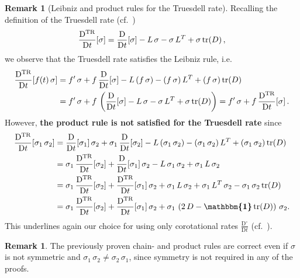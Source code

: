 \documentclass[10pt]{article}
\newcounter{theoremCounter}
\numberwithin{theoremCounter}{section}
\theoremstyle{plain}
\theoremstyle{definition}
\newtheorem{rem}[theoremCounter]{Remark}
\newcommand{\id}{{\boldsymbol{\mathbbm{1}}}}
\newcommand{\DD}{\mathrm{D}}
\DeclareMathOperator{\tr}{tr}
\DeclareMathOperator{\TR}{TR}
\def\tr{\textnormal{tr}}
\numberwithin{equation}{section}
\begin{document}
%
\begin{rem}[Leibniz and product rules for the Truesdell rate]
Recalling the definition of the Truesdell rate (cf.~\cite[eq.~3]{truesdellremarks})
	\begin{align}
	\frac{\DD^{\TR}}{\DD t}[\sigma] = \frac{\DD}{\DD t}[\sigma] - L \, \sigma - \sigma \, L^T + \sigma \, \tr(D) \, ,
	\end{align}
we observe that the Truesdell rate satisfies the Leibniz rule, i.e.
	\begin{equation}
	\begin{alignedat}{2}
	\frac{\DD^{\TR}}{\DD t}[f(t) \, \sigma] &= f' \, \sigma + f \, \frac{\DD}{\DD t}[\sigma] - L \, (f \, \sigma) - (f \, \sigma) \, L^T + (f \, \sigma) \, \tr(D) \\ 
	&= f' \, \sigma + f \, \left(\frac{\DD}{\DD t}[\sigma] - L \, \sigma - \sigma \, L^T + \sigma \, \tr(D)\right) = f' \, \sigma + f \, \frac{\DD^{\TR}}{\DD t}[\sigma] \, .
	\end{alignedat}
	\end{equation}
However, \textbf{the product rule is not satisfied for the Truesdell rate} since
	\begin{equation}
	\begin{alignedat}{2}
	\frac{\DD^{\TR}}{\DD t}[\sigma_1 \, \sigma_2] &= \frac{\DD}{\DD t}[\sigma_1] \, \sigma_2 + \sigma_1 \, \frac{\DD}{\DD t}[\sigma_2] - L \, (\sigma_1 \, \sigma_2) - (\sigma_1 \, \sigma_2) \, L^T + (\sigma_1 \, \sigma_2) \, \tr(D) \\ 
	&= \sigma_1 \, \frac{\DD^{\TR}}{\DD t}[\sigma_2] + \frac{\DD}{\DD t}[\sigma_1] \, \sigma_2 - L \, \sigma_1 \, \sigma_2 + \sigma_1 \, L \, \sigma_2 \\
	&= \sigma_1 \, \frac{\DD^{\TR}}{\DD t}[\sigma_2] + \frac{\DD^{\TR}}{\DD t}[\sigma_1] \, \sigma_2 + \sigma_1 \, L \, \sigma_2 + \sigma_1 \, L^T \, \sigma_2 - \sigma_1 \, \sigma_2 \, \tr(D) \\
	&= \sigma_1 \, \frac{\DD^{\TR}}{\DD t}[\sigma_2] + \frac{\DD^{\TR}}{\DD t}[\sigma_1] \, \sigma_2 + \sigma_1 \, \left(2 \, D - \id \, \tr(D)\right) \, \sigma_2.
	\end{alignedat}
	\end{equation}
This underlines again our choice for using only corotational rates $\frac{\DD^{\circ}}{\DD t}$ (cf.~\cite{neffkoro2024}).
%
\end{rem}
%
\begin{rem}
The previously proven chain- and product rules are correct even if $\sigma$ is not symmetric and $\sigma_1 \, \sigma_2 \neq \sigma_2 \, \sigma_1$, since symmetry is not required in any of the proofs.
\end{rem}
\end{document}
